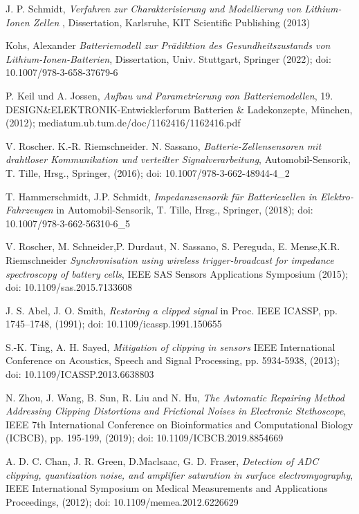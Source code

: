 \begin{thebibliography}{[99]}
	J. P. Schmidt, \textit{Verfahren zur Charakterisierung und Modellierung von Lithium-Ionen Zellen} , Dissertation, Karlsruhe, KIT Scientific Publishing (2013)
	
	Kohs, Alexander \textit{Batteriemodell zur Prädiktion des Gesundheitszustands von Lithium-Ionen-Batterien}, Dissertation, Univ. Stuttgart, Springer (2022); doi: 10.1007/978-3-658-37679-6
	
	P. Keil und A. Jossen, \textit{Aufbau und Parametrierung von Batteriemodellen}, 19. DESIGN\&ELEKTRONIK-Entwicklerforum Batterien \& Ladekonzepte, München, (2012); mediatum.ub.tum.de/doc/1162416/1162416.pdf
	
	V. Roscher. K.-R. Riemschneider. N. Sassano, \textit{Batterie-Zellensensoren mit drahtloser Kommunikation und verteilter Signalverarbeitung}, Automobil-Sensorik, T. Tille, Hrsg., Springer, (2016); doi: 10.1007/978-3-662-48944-4\_2
	
	T. Hammerschmidt, J.P. Schmidt, \textit{Impedanzsensorik für Batteriezellen in Elektro-Fahrzeugen} in Automobil-Sensorik, T. Tille, Hrsg., Springer, (2018); doi: 10.1007/978-3-662-56310-6\_5
	
	V. Roscher, M. Schneider,P.  Durdaut, N. Sassano, S. Pereguda, E. Mense,K.R. Riemschneider
	\textit{Synchronisation using wireless trigger-broadcast for impedance spectroscopy of battery cells},	IEEE SAS Sensors Applications Symposium (2015);	doi: 10.1109/sas.2015.7133608
	
	J. S. Abel, J. O. Smith, \textit{Restoring a clipped signal} in
	Proc. IEEE ICASSP, pp. 1745–1748, (1991); doi: 10.1109/icassp.1991.150655 
	
	S.-K. Ting, A. H. Sayed, \textit{Mitigation of clipping in sensors} IEEE International Conference on Acoustics, Speech and Signal Processing, pp. 5934-5938, (2013); doi: 10.1109/ICASSP.2013.6638803
	
	N. Zhou, J. Wang, B. Sun, R. Liu and N. Hu, \textit{The Automatic Repairing Method Addressing Clipping Distortions and Frictional Noises in Electronic Stethoscope}, IEEE 7th International Conference on Bioinformatics and Computational Biology (ICBCB), pp. 195-199, (2019); doi: 10.1109/ICBCB.2019.8854669
	
	A. D. C. Chan, J. R. Green, D.Maclsaac, G. D. Fraser, \textit{Detection of ADC clipping, quantization noise, and amplifier saturation in surface electromyography}, IEEE International Symposium on Medical Measurements and Applications Proceedings, (2012); doi: 10.1109/memea.2012.6226629 
	

\end{thebibliography}

